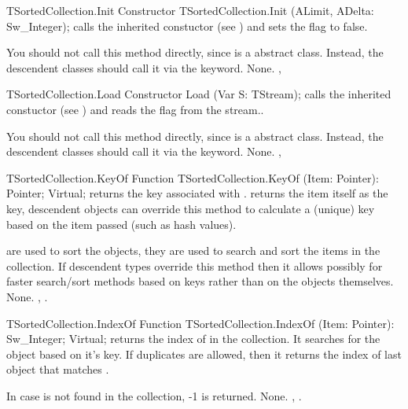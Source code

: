 \begin{procedure}{TSortedCollection.Init}
\Declaration
Constructor TSortedCollection.Init (ALimit, ADelta: Sw\_Integer);
\Description
{} calls the inherited constuctor (see ) and
sets the  flag to false.

You should not call this method directly, since  is a
abstract class. Instead, the descendent classes should call it via the
 keyword.
\Errors
None.
\SeeAlso 
{}, 
\end{procedure}

\begin{procedure}{TSortedCollection.Load}
\Declaration
Constructor Load (Var S: TStream);
\Description
{} calls the inherited constuctor (see ) and
reads the  flag from the stream..

You should not call this method directly, since  is a
abstract class. Instead, the descendent classes should call it via the
 keyword.
\Errors
None.
\SeeAlso 
{}, 
\end{procedure}

\begin{function}{TSortedCollection.KeyOf}
\Declaration
Function TSortedCollection.KeyOf (Item: Pointer): Pointer; Virtual;
\Description
{} returns the key associated with .
 returns the item itself as the key, descendent
objects can override this method to calculate a (unique) key based on the
item passed (such as hash values).

 are used to sort the objects, they are used to search and sort
the items in the collection. If descendent types override this method then
it allows possibly for faster search/sort methods based on keys rather than
on the objects themselves.
\Errors
None.
\SeeAlso
{},
.
\end{function}

\begin{function}{TSortedCollection.IndexOf}
\Declaration
Function TSortedCollection.IndexOf (Item: Pointer): Sw\_Integer; Virtual;
\Description
{} returns the index of  in the collection. It searches
for the object based on it's key. If duplicates are allowed, then it returns 
the index of last object that matches .

In case  is not found in the collection, -1 is returned.
\Errors
None.
\SeeAlso
{},
.
\end{function}

